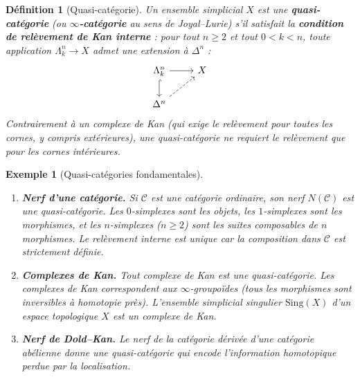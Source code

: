 \documentclass[a4paper,12pt]{book}
\newtheorem{definition}[theoreme]{Définition}
\newtheorem{exemple}[theoreme]{Exemple}
\begin{document}
\begin{definition}[Quasi-catégorie]\label{def:quasi-categorie}
Un ensemble simplicial $X$ est une \textbf{quasi-catégorie}
(ou \textbf{$\infty$-catégorie} au sens de Joyal--Lurie) s'il
satisfait la \textbf{condition de relèvement de Kan interne} :
pour tout $n \geq 2$ et tout $0 < k < n$, toute application
$\Lambda^n_k \to X$ admet une extension à $\Delta^n$ :
\[
\begin{tikzcd}
\Lambda^n_k \arrow[r] \arrow[d, hook] & X \\
\Delta^n \arrow[ur, dashed] &
\end{tikzcd}
\]
Contrairement à un complexe de Kan (qui exige le relèvement pour
\emph{toutes} les cornes, y compris extérieures), une quasi-catégorie
ne requiert le relèvement que pour les cornes intérieures.
\end{definition}

\begin{exemple}[Quasi-catégories fondamentales]\label{ex:quasi-categories}
\begin{enumerate}[label=(\roman*)]
\item \textbf{Nerf d'une catégorie.}
      Si $\mathcal{C}$ est une catégorie ordinaire, son nerf
      $N(\mathcal{C})$ est une quasi-catégorie.
      Les $0$-simplexes sont les objets, les $1$-simplexes sont les
      morphismes, et les $n$-simplexes ($n \geq 2$) sont les suites
      composables de $n$ morphismes.
      Le relèvement interne est \emph{unique} car la composition dans
      $\mathcal{C}$ est strictement définie.

\item \textbf{Complexes de Kan.}
      Tout complexe de Kan est une quasi-catégorie.
      Les complexes de Kan correspondent aux $\infty$-groupoïdes
      (tous les morphismes sont inversibles à homotopie près).
      L'ensemble simplicial singulier $\mathrm{Sing}(X)$ d'un espace
      topologique $X$ est un complexe de Kan.

\item \textbf{Nerf de Dold--Kan.}
      Le nerf de la catégorie dérivée d'une catégorie abélienne
      donne une quasi-catégorie qui encode l'information homotopique
      perdue par la localisation.
\end{enumerate}
\end{exemple}
\end{document}
